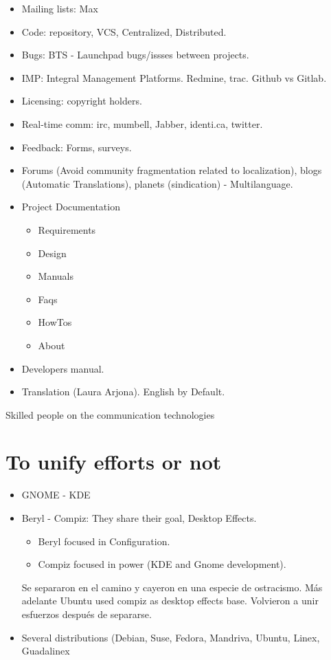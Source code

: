 \documentclass[11pt]{scrartcl}
\begin{document}
\begin{itemize}
    \item Mailing lists: Max
	\item Code: repository, VCS, Centralized, Distributed.
	\item Bugs: BTS - Launchpad bugs/issses between projects.
	\item IMP: Integral Management Platforms. Redmine, trac. Github vs Gitlab.
	\item Licensing: copyright holders.
	\item Real-time comm: irc, mumbell, Jabber, identi.ca, twitter.
	\item Feedback: Forms, surveys.
	\item Forums  (Avoid community fragmentation related to localization), blogs (Automatic Translations), planets (sindication) - Multilanguage.
	\item Project Documentation
	\begin{itemize}
	    \item Requirements
	    \item Design
	    \item Manuals
	    \item Faqs
	    \item HowTos
	    \item About
    \end{itemize}
    \item Developers manual.
    \item Translation (Laura Arjona). English by Default.
\end{itemize}

Skilled people on the communication technologies

\section{To unify efforts or not}

\begin{itemize}
	\item GNOME - KDE
	\item Beryl - Compiz: They share their goal, Desktop Effects.
	\begin{itemize}
	    \item Beryl focused in Configuration.
	    \item Compiz focused in power (KDE and Gnome development).
    \end{itemize}
    Se separaron en el camino y cayeron en una especie de ostracismo.
    Más adelante Ubuntu used compiz as desktop effects base. Volvieron a unir esfuerzos después de separarse.
	\item Several distributions (Debian, Suse, Fedora, Mandriva, Ubuntu, Linex, Guadalinex
\end{itemize}
\end{document}

